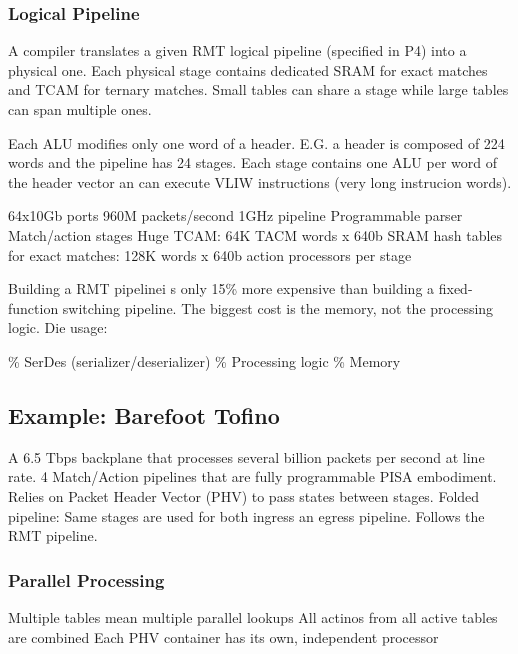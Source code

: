\documentclass[a4paper, fontsize=8pt, landscape, DIV=1]{scrartcl}
\begin{document}
\begin{multicols*}{4}
  \subsubsection{Logical Pipeline}
  A compiler translates a given RMT logical pipeline (specified in P4) into a 
  physical one. Each physical stage contains dedicated SRAM for exact matches and
  TCAM for ternary matches. Small tables can share a stage while large tables can
  span multiple ones.

  Each ALU modifies only one word of a header. E.G. a header is composed of 224 words
  and the pipeline has 24 stages. Each stage contains one ALU per word of the header vector
  an can execute VLIW instructions (very long instrucion words).
  \begin{outline}
  \1 64x10Gb ports
    \2 960M packets/second
    \2 1GHz pipeline
  \1 Programmable parser
   Match/action stages
  \1 Huge TCAM: 64K TACM words x 640b
  \1 SRAM hash tables for exact matches: 128K words x 640b
   action processors per stage
  \end{outline}

  Building a RMT pipelinei s only 15\% more expensive than building a fixed-function 
  switching pipeline. The biggest cost is the memory, not the processing logic. Die usage:
  \begin{outline}
  \% SerDes (serializer/deserializer)
  \% Processing logic
  \% Memory
  \end{outline}

  \subsection{Example: Barefoot Tofino}
  A 6.5 Tbps backplane that processes several billion packets per second at line rate.
  4 Match/Action pipelines that are fully programmable PISA embodiment. Relies on
  Packet Header Vector (PHV) to pass states between stages. Folded pipeline: Same 
  stages are used for both ingress an egress pipeline. Follows the RMT pipeline.

  \subsubsection{Parallel Processing}
  \begin{outline}
  \1 Multiple tables mean multiple parallel lookups
  \1 All actinos from all active tables are combined
  \1 Each PHV container has its own, independent processor
  \end{outline}


\end{multicols*}
\end{document}
